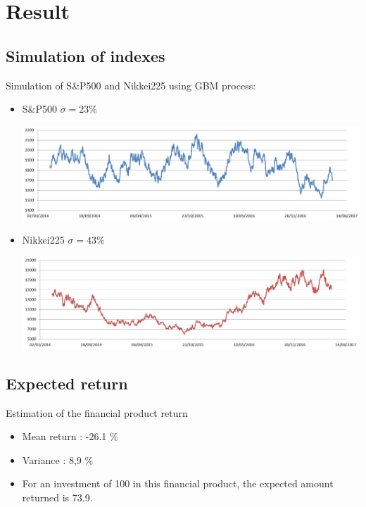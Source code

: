 \section{Result}

\subsection{Simulation of indexes}
\begin{frame}
\myframetitle{}
Simulation of S\&P500 and Nikkei225 using GBM process:
\begin{itemize}
	\item S\&P500 $\sigma = 23 \%$ \\
	\begin{center}
	\vspace{0.3cm}
	\includegraphics[width=0.7\linewidth]{../Report/SandP500_simulated}
	\end{center}
	\item Nikkei225 $\sigma = 43 \%$\\
	\begin{center}
	\vspace{0.3cm}
	\includegraphics[width=0.7\linewidth]{../Report/Nikkei225_simulated}
	\end{center}
	
\end{itemize}
\end{frame}

\subsection{Expected return}
\begin{frame}[c]
\myframetitle{}
Estimation of the financial product return
\begin{itemize}
	\item Mean return : -26.1 \%
	\item Variance :  8,9 \%
\end{itemize}

\vspace{1cm}

\begin{itemize}
\item For an investment of 100 in this financial product, the expected amount returned is 73.9.
\end{itemize}

\end{frame}

